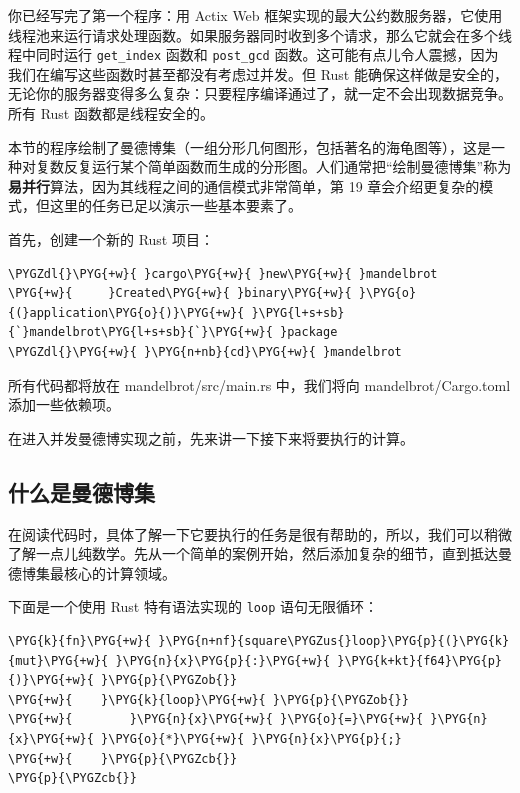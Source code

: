 你已经写完了第一个程序：用 Actix Web 框架实现的最大公约数服务器，它使用线程池来运行请求处理函数。如果服务器同时收到多个请求，那么它就会在多个线程中同时运行 \texttt{get\_index} 函数和 \texttt{post\_gcd} 函数。这可能有点儿令人震撼，因为我们在编写这些函数时甚至都没有考虑过并发。但 Rust 能确保这样做是安全的，无论你的服务器变得多么复杂：只要程序编译通过了，就一定不会出现数据竞争。所有 Rust 函数都是线程安全的。

本节的程序绘制了曼德博集（一组分形几何图形，包括著名的海龟图等），这是一种对复数反复运行某个简单函数而生成的分形图。人们通常把“绘制曼德博集”称为\textbf{易并行}算法，因为其线程之间的通信模式非常简单，第 19 章会介绍更复杂的模式，但这里的任务已足以演示一些基本要素了。

首先，创建一个新的 Rust 项目：

\begin{Verbatim}[commandchars=\\\{\},breaklines=true,breakanywhere=true,fontsize=\codefont,xleftmargin=17bp]
\PYGZdl{}\PYG{+w}{ }cargo\PYG{+w}{ }new\PYG{+w}{ }mandelbrot
\PYG{+w}{     }Created\PYG{+w}{ }binary\PYG{+w}{ }\PYG{o}{(}application\PYG{o}{)}\PYG{+w}{ }\PYG{l+s+sb}{`}mandelbrot\PYG{l+s+sb}{`}\PYG{+w}{ }package
\PYGZdl{}\PYG{+w}{ }\PYG{n+nb}{cd}\PYG{+w}{ }mandelbrot
\end{Verbatim}

所有代码都将放在 mandelbrot/\allowbreak{}src/\allowbreak{}main.rs 中，我们将向 mandelbrot/\allowbreak{}Cargo.toml 添加一些依赖项。

在进入并发曼德博实现之前，先来讲一下接下来将要执行的计算。

\subsection{什么是曼德博集}

在阅读代码时，具体了解一下它要执行的任务是很有帮助的，所以，我们可以稍微了解一点儿纯数学。先从一个简单的案例开始，然后添加复杂的细节，直到抵达曼德博集最核心的计算领域。

下面是一个使用 Rust 特有语法实现的 \texttt{loop} 语句无限循环：

\begin{Verbatim}[commandchars=\\\{\},breaklines=true,breakanywhere=true,fontsize=\codefont,xleftmargin=17bp]
\PYG{k}{fn}\PYG{+w}{ }\PYG{n+nf}{square\PYGZus{}loop}\PYG{p}{(}\PYG{k}{mut}\PYG{+w}{ }\PYG{n}{x}\PYG{p}{:}\PYG{+w}{ }\PYG{k+kt}{f64}\PYG{p}{)}\PYG{+w}{ }\PYG{p}{\PYGZob{}}
\PYG{+w}{    }\PYG{k}{loop}\PYG{+w}{ }\PYG{p}{\PYGZob{}}
\PYG{+w}{        }\PYG{n}{x}\PYG{+w}{ }\PYG{o}{=}\PYG{+w}{ }\PYG{n}{x}\PYG{+w}{ }\PYG{o}{*}\PYG{+w}{ }\PYG{n}{x}\PYG{p}{;}
\PYG{+w}{    }\PYG{p}{\PYGZcb{}}
\PYG{p}{\PYGZcb{}}
\end{Verbatim}

